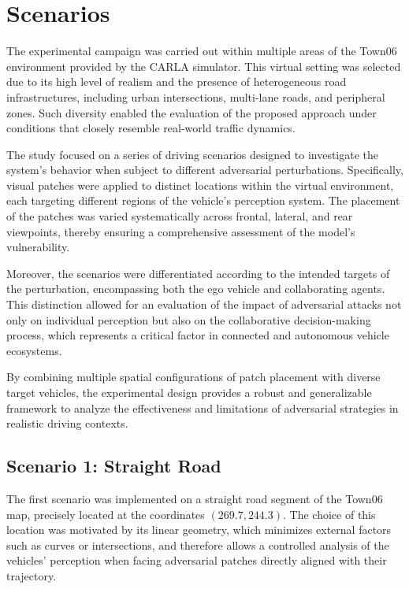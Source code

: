 \section{Scenarios}

The experimental campaign was carried out within multiple areas of the Town06 environment provided by the CARLA simulator.  
This virtual setting was selected due to its high level of realism and the presence of heterogeneous road infrastructures, including urban intersections, multi-lane roads, and peripheral zones. Such diversity enabled the evaluation of the proposed approach under conditions that closely resemble real-world traffic dynamics.

The study focused on a series of driving scenarios designed to investigate the system’s behavior when subject to different adversarial perturbations. Specifically, visual patches were applied to distinct locations within the virtual environment, each targeting different regions of the vehicle’s perception system. The placement of the patches was varied systematically across frontal, lateral, and rear viewpoints, thereby ensuring a comprehensive assessment of the model’s vulnerability.

Moreover, the scenarios were differentiated according to the intended targets of the perturbation, encompassing both the ego vehicle and collaborating agents. This distinction allowed for an evaluation of the impact of adversarial attacks not only on individual perception but also on the collaborative decision-making process, which represents a critical factor in connected and autonomous vehicle ecosystems.

By combining multiple spatial configurations of patch placement with diverse target vehicles, the experimental design provides a robust and generalizable framework to analyze the effectiveness and limitations of adversarial strategies in realistic driving contexts.

\subsection{Scenario 1: Straight Road}
\label{subsec:scenario1}

The first scenario was implemented on a straight road segment of the Town06 map, precisely located at the coordinates $(269.7, 244.3)$.  
The choice of this location was motivated by its linear geometry, which minimizes external factors such as curves or intersections, and therefore allows a controlled analysis of the vehicles’ perception when facing adversarial patches directly aligned with their trajectory.

